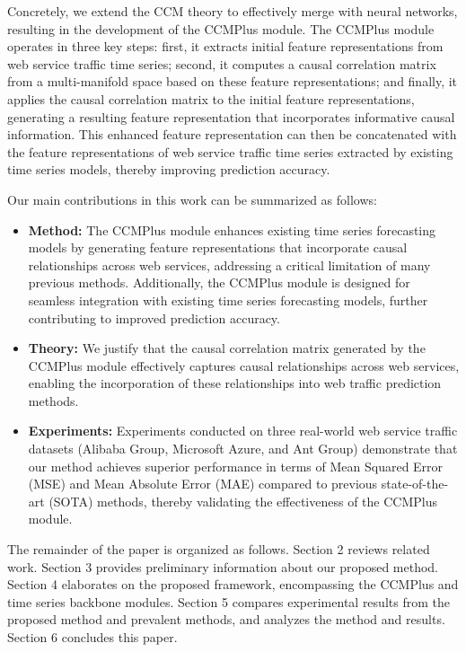 Concretely, we extend the CCM theory to effectively merge with neural networks, resulting in the development of the CCMPlus module. The CCMPlus module operates in three key steps: first, it extracts initial feature representations from web service traffic time series; second, it computes a causal correlation matrix from a multi-manifold space based on these feature representations; and finally, it applies the causal correlation matrix to the initial feature representations, generating a resulting feature representation that incorporates informative causal information. This enhanced feature representation can then be concatenated with the feature representations of web service traffic time series extracted by existing time series models, thereby improving prediction accuracy.

Our main contributions in this work can be summarized as follows:
\begin{itemize}
    \item \textbf{Method:} 
    The CCMPlus module enhances existing time series forecasting models by generating feature representations that incorporate causal relationships across web services, addressing a critical limitation of many previous methods. Additionally, the CCMPlus module is designed for seamless integration with existing time series forecasting models, further contributing to improved prediction accuracy.
    \item \textbf{Theory:} We justify that the causal correlation matrix generated by the CCMPlus module effectively captures causal relationships across web services, enabling the incorporation of these relationships into web traffic prediction methods.
    \item \textbf{Experiments:} Experiments conducted on three real-world web service traffic datasets (Alibaba Group, Microsoft Azure, and Ant Group) demonstrate that our method achieves superior performance in terms of Mean Squared Error (MSE) and Mean Absolute Error (MAE) compared to previous state-of-the-art (SOTA) methods, thereby validating the effectiveness of the CCMPlus module.
\end{itemize}

The remainder of the paper is organized as follows. Section 2 reviews related work. Section 3 provides preliminary information about our proposed method. Section 4 elaborates on the proposed framework, encompassing the CCMPlus and time series backbone modules. Section 5 compares experimental results from the proposed method and prevalent methods, and analyzes the method and results. Section 6 concludes this paper.

